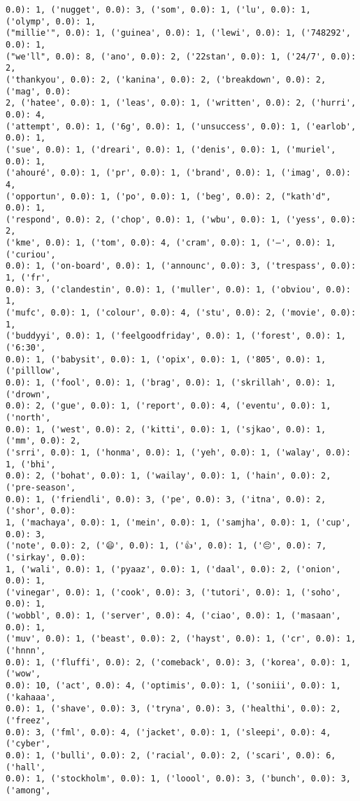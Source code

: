 \documentclass[11pt]{article}
\begin{document}
\begin{Verbatim}[commandchars=\\\{\}]
0.0): 1, ('nugget', 0.0): 3, ('som', 0.0): 1, ('lu', 0.0): 1, ('olymp', 0.0): 1,
("millie'", 0.0): 1, ('guinea', 0.0): 1, ('lewi', 0.0): 1, ('748292', 0.0): 1,
("we'll", 0.0): 8, ('ano', 0.0): 2, ('22stan', 0.0): 1, ('24/7', 0.0): 2,
('thankyou', 0.0): 2, ('kanina', 0.0): 2, ('breakdown', 0.0): 2, ('mag', 0.0):
2, ('hatee', 0.0): 1, ('leas', 0.0): 1, ('written', 0.0): 2, ('hurri', 0.0): 4,
('attempt', 0.0): 1, ('6g', 0.0): 1, ('unsuccess', 0.0): 1, ('earlob', 0.0): 1,
('sue', 0.0): 1, ('dreari', 0.0): 1, ('denis', 0.0): 1, ('muriel', 0.0): 1,
('ahouré', 0.0): 1, ('pr', 0.0): 1, ('brand', 0.0): 1, ('imag', 0.0): 4,
('opportun', 0.0): 1, ('po', 0.0): 1, ('beg', 0.0): 2, ("kath'd", 0.0): 1,
('respond', 0.0): 2, ('chop', 0.0): 1, ('wbu', 0.0): 1, ('yess', 0.0): 2,
('kme', 0.0): 1, ('tom', 0.0): 4, ('cram', 0.0): 1, ('–', 0.0): 1, ('curiou',
0.0): 1, ('on-board', 0.0): 1, ('announc', 0.0): 3, ('trespass', 0.0): 1, ('fr',
0.0): 3, ('clandestin', 0.0): 1, ('muller', 0.0): 1, ('obviou', 0.0): 1,
('mufc', 0.0): 1, ('colour', 0.0): 4, ('stu', 0.0): 2, ('movie', 0.0): 1,
('buddyyi', 0.0): 1, ('feelgoodfriday', 0.0): 1, ('forest', 0.0): 1, ('6:30',
0.0): 1, ('babysit', 0.0): 1, ('opix', 0.0): 1, ('805', 0.0): 1, ('pilllow',
0.0): 1, ('fool', 0.0): 1, ('brag', 0.0): 1, ('skrillah', 0.0): 1, ('drown',
0.0): 2, ('gue', 0.0): 1, ('report', 0.0): 4, ('eventu', 0.0): 1, ('north',
0.0): 1, ('west', 0.0): 2, ('kitti', 0.0): 1, ('sjkao', 0.0): 1, ('mm', 0.0): 2,
('srri', 0.0): 1, ('honma', 0.0): 1, ('yeh', 0.0): 1, ('walay', 0.0): 1, ('bhi',
0.0): 2, ('bohat', 0.0): 1, ('wailay', 0.0): 1, ('hain', 0.0): 2, ('pre-season',
0.0): 1, ('friendli', 0.0): 3, ('pe', 0.0): 3, ('itna', 0.0): 2, ('shor', 0.0):
1, ('machaya', 0.0): 1, ('mein', 0.0): 1, ('samjha', 0.0): 1, ('cup', 0.0): 3,
('note', 0.0): 2, ('😄', 0.0): 1, ('👍', 0.0): 1, ('😔', 0.0): 7, ('sirkay', 0.0):
1, ('wali', 0.0): 1, ('pyaaz', 0.0): 1, ('daal', 0.0): 2, ('onion', 0.0): 1,
('vinegar', 0.0): 1, ('cook', 0.0): 3, ('tutori', 0.0): 1, ('soho', 0.0): 1,
('wobbl', 0.0): 1, ('server', 0.0): 4, ('ciao', 0.0): 1, ('masaan', 0.0): 1,
('muv', 0.0): 1, ('beast', 0.0): 2, ('hayst', 0.0): 1, ('cr', 0.0): 1, ('hnnn',
0.0): 1, ('fluffi', 0.0): 2, ('comeback', 0.0): 3, ('korea', 0.0): 1, ('wow',
0.0): 10, ('act', 0.0): 4, ('optimis', 0.0): 1, ('soniii', 0.0): 1, ('kahaaa',
0.0): 1, ('shave', 0.0): 3, ('tryna', 0.0): 3, ('healthi', 0.0): 2, ('freez',
0.0): 3, ('fml', 0.0): 4, ('jacket', 0.0): 1, ('sleepi', 0.0): 4, ('cyber',
0.0): 1, ('bulli', 0.0): 2, ('racial', 0.0): 2, ('scari', 0.0): 6, ('hall',
0.0): 1, ('stockholm', 0.0): 1, ('loool', 0.0): 3, ('bunch', 0.0): 3, ('among',

\end{Verbatim}
\end{document}

